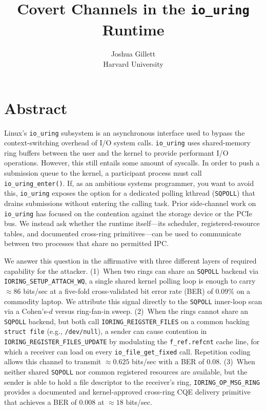 \documentclass[letterpaper,twocolumn,10pt]{article}
\newcommand{\code}[1]{\texttt{#1}}
\newcommand{\iouring}{\texttt{io\_uring}\xspace}
\begin{document}
\date{}

\title{\Large \bf Covert Channels in the \texttt{io\_uring} Runtime}

\author{
{\rm Joshua Gillett}\\
Harvard University
}

\maketitle
\thispagestyle{empty}

\section*{Abstract}
Linux's \iouring subsystem is an asynchronous interface used to bypass the context-switching overhead of I/O system calls. \iouring uses shared-memory ring buffers between the user and the kernel to provide performant I/O operations. However, this still entails some amount of syscalls. In order to push a submission queue to the kernel, a participant process must call \code{io\_uring\_enter()}. If, as an ambitious systems programmer, you want to avoid this, \iouring exposes the option for a dedicated polling kthread (\code{SQPOLL}) that drains submissions without entering the calling task. Prior side-channel work on \iouring has focused on the contention against the storage device or the PCIe bus. We instead ask whether the runtime itself---its scheduler, registered-resource tables, and documented cross-ring primitives---can be used to communicate between two processes that share no permitted IPC.

We answer this question in the affirmative with three different layers of required capability for the attacker. (1)~When two rings can share an \code{SQPOLL} backend via \code{IORING\_SETUP\_ATTACH\_WQ}, a single shared kernel polling loop is enough to carry $\approx86$ bits/sec at a five-fold cross-validated bit error rate (BER) of $0.09\%$ on a commodity laptop. We attribute this signal directly to the \code{SQPOLL} inner-loop scan via a Cohen's-$d$ versus ring-fan-in sweep. (2)~When the rings cannot share an \code{SQPOLL} backend, but both call \code{IORING\_REIGSTER\_FILES} on a common backing \code{struct file} (e.g., \code{/dev/null}), a sender can cause contention in \code{IORING\_REGISTER\_FILES\_UPDATE} by modulating the \code{f\_ref.refcnt} cache line, for which a receiver can load on every \code{io\_file\_get\_fixed} call. Repetition coding allows this channel to transmit $\approx0.625$ bits/sec with a BER of $0.08$. (3)~When neither shared \code{SQPOLL} nor common registered resources are available, but the sender is able to hold a file descriptor to the receiver's ring, \code{IORING\_OP\_MSG\_RING} provides a documented and kernel-approved cross-ring CQE delivery primitive that achieves a BER of $0.008$ at $\approx18$ bits/sec.
\end{document}
